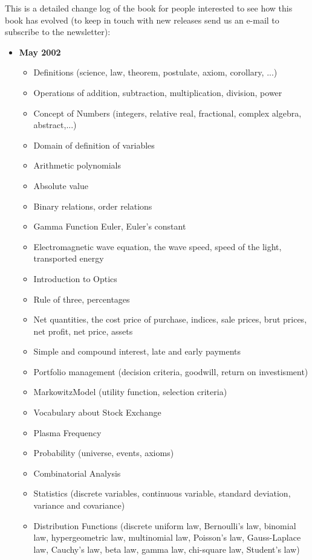 \documentclass[12pt,a4paper,twoside,openright]{report}
\newcounter{def}
\theoremstyle{definition}
\theoremstyle{itexmp}
\numberwithin{equation}{section}
\begin{document}
This is a detailed change log of the book for people interested to see how this book has evolved (to keep in touch with new releases send us an e-mail to subscribe to the newsletter):
	\begin{itemize}
		\item \textbf{May 2002}
		\begin{itemize}[noitemsep]
			\item Definitions (science, law, theorem, postulate, axiom, corollary, ...)
			\item Operations of addition, subtraction, multiplication, division, power
			\item Concept of Numbers (integers, relative real, fractional, complex algebra, abstract,...)
			\item Domain of definition of variables
			\item Arithmetic polynomials
			\item Absolute value
			\item Binary relations, order relations
			\item Gamma Function Euler, Euler's constant
			\item Electromagnetic wave equation, the wave speed, speed of the light, transported energy
			\item Introduction to Optics
			\item Rule of three, percentages
			\item Net quantities, the cost price of purchase, indices, sale prices, brut prices, net profit, net price, assets
			\item Simple and compound interest, late and early payments
			\item Portfolio management (decision criteria, goodwill, return on investisment)
			\item MarkowitzModel  (utility function, selection criteria)
			\item Vocabulary about Stock Exchange
			\item Plasma Frequency
			\item Probability (universe, events, axioms)
			\item Combinatorial Analysis
			\item Statistics (discrete variables, continuous variable, standard deviation, variance and covariance)
			\item Distribution Functions (discrete uniform law, Bernoulli's law, binomial law, hypergeometric law, multinomial law, Poisson's law, Gauss-Laplace law, Cauchy's law, beta law, gamma law, chi-square law, Student's law)

\end{itemize}
\end{itemize}
\end{document}
